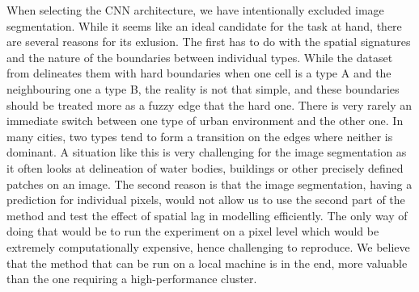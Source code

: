 When selecting the CNN architecture, we have intentionally excluded image
segmentation. While it seems like an ideal candidate for the task at hand, there are
several reasons for its exlusion. The first has to do with the spatial signatures and the
nature of the boundaries between individual types. While the dataset from
\cite{fleischmann2022geographical} delineates them with hard boundaries when one cell
is a type A and the neighbouring one a type B, the reality is not that simple, and these
boundaries should be treated more as a fuzzy edge that the hard one. There is very rarely an immediate
switch between one type of urban environment and the other one. In many cities, two
types tend to form a transition on the edges where neither is dominant. A situation like
this is very challenging for the image segmentation as it often looks at delineation of
water bodies, buildings or other precisely defined patches on an image. The second reason is that the image
segmentation, having a prediction for individual pixels, would not allow us to use the
second part of the method and test the effect of spatial lag in modelling efficiently. The only
way of doing that would be to run the experiment on a pixel level which would be
extremely computationally expensive, hence challenging to reproduce. We believe that the
method that can be run on a local machine is in the end, more valuable than the one
requiring a high-performance cluster.